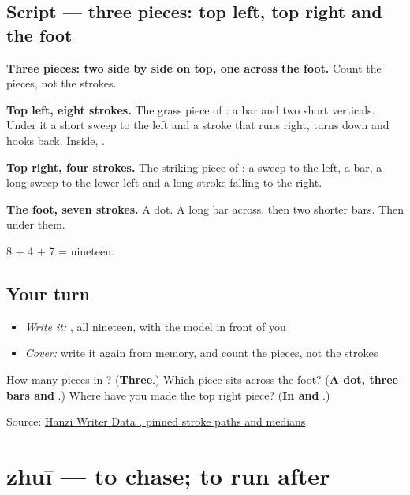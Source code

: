 \subsection*{Script — three pieces: top left, top right and the foot}

\begin{quote}
\end{quote}

\textbf{Three pieces: two side by side on top, one across the foot.} Count the pieces, not the strokes.

\textbf{Top left, eight strokes.} The grass piece of : a bar and two short verticals. Under it a short sweep to the left and a stroke that runs right, turns down and hooks back. Inside, .

\textbf{Top right, four strokes.} The striking piece of : a sweep to the left, a bar, a long sweep to the lower left and a long stroke falling to the right.

\textbf{The foot, seven strokes.} A dot. A long bar across, then two shorter bars. Then  under them.

8 + 4 + 7 = nineteen.

\subsection*{Your turn}
\begin{itemize}
\raggedright
  \item \emph{Write it:} , all nineteen, with the model in front of you
  \item \emph{Cover:} write it again from memory, and count the pieces, not the strokes
\end{itemize}

\begin{tcolorbox}[breakable,colback=teal!4,colframe=teal!35!black,title={Before you move on}]
How many pieces in ? (\textbf{Three}.) Which piece sits across the foot? (\textbf{A dot, three bars and }.) Where have you made the top right piece? (\textbf{In  and }.)

Source: \href{https://raw.githubusercontent.com/chanind/hanzi-writer-data/68d10a4b21150cae5e1ebbd223eed289cf32d90c/data/\%E8\%AD\%A6.json}{Hanzi Writer Data , pinned stroke paths and medians}.
\end{tcolorbox}
\section[zhuī]{zhuī — to chase; to run after}

